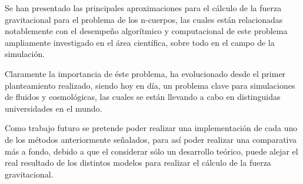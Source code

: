 
Se han presentado las principales aproximaciones para el cálculo de la fuerza
gravitacional para el problema de los n-cuerpos, las cuales están relacionadas
notablemente con el desempeño algorítmico y computacional de este problema
ampliamente investigado en el área científica, sobre todo en el campo
de la simulación.

Claramente la importancia de éste problema, ha evolucionado desde el
primer planteamiento realizado, siendo hoy en día, un problema clave
para simulaciones de fluidos y cosmológicas, las cuales se están llevando
a cabo en distinguidas universidades en el mundo.

Como trabajo futuro se pretende poder realizar una implementación
de cada uno de los métodos anteriormente señalados, para así poder realizar
una comparativa más a fondo, debido a que el considerar sólo un desarrollo
teórico, puede alejar el real resultado de los distintos modelos
para realizar el cálculo de la fuerza gravitacional.

